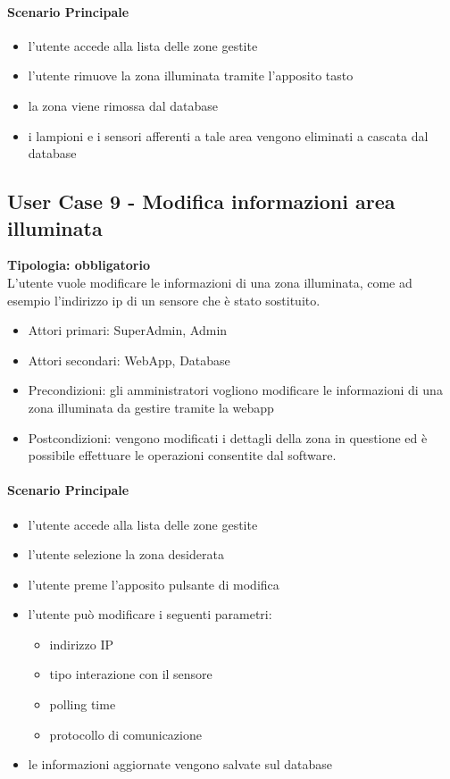 \documentclass[12pt]{article}
\begin{document}
\paragraph{Scenario Principale}
\begin{itemize}
	\item l'utente accede alla lista delle zone gestite
	\item l'utente rimuove la zona illuminata tramite l'apposito tasto
	\item la zona viene rimossa dal database 
	\item i lampioni e i sensori afferenti a tale area vengono eliminati a cascata dal database
\end{itemize}

\subsection{User Case 9 - Modifica informazioni area illuminata}
\textbf{Tipologia: obbligatorio} \\
L'utente vuole modificare le informazioni di una zona illuminata, come ad esempio l'indirizzo ip di un sensore che è stato sostituito.
\begin{itemize}
	\item Attori primari: SuperAdmin, Admin
	\item Attori secondari: WebApp, Database
	\item Precondizioni: gli amministratori vogliono modificare le informazioni di una  zona illuminata da gestire tramite la webapp
	\item Postcondizioni: vengono modificati i dettagli della zona in questione ed è possibile effettuare le operazioni consentite dal software.
\end{itemize}
\paragraph{Scenario Principale}
\begin{itemize}
	\item l'utente accede alla lista delle zone gestite
	\item l'utente selezione la zona desiderata
	\item l'utente preme l'apposito pulsante di modifica
	\item l'utente può modificare i seguenti parametri:
		\begin{itemize}
			\item indirizzo IP
			\item tipo interazione con il sensore
			\item polling time
			\item protocollo di comunicazione
		\end{itemize}
	\item le informazioni aggiornate vengono salvate sul database
\end{itemize}
\end{document}
